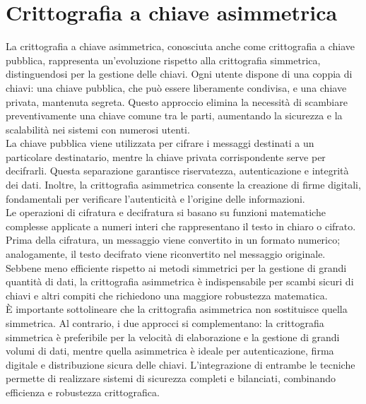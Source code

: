 \documentclass[12pt]{report}
\begin{document}
\section{Crittografia a chiave asimmetrica}  
La crittografia a chiave asimmetrica, conosciuta anche come crittografia a chiave pubblica, rappresenta un'evoluzione rispetto alla crittografia simmetrica, distinguendosi per la gestione delle chiavi. Ogni utente dispone di una coppia di chiavi: una chiave pubblica, che può essere liberamente condivisa, e una chiave privata, mantenuta segreta. Questo approccio elimina la necessità di scambiare preventivamente una chiave comune tra le parti, aumentando la sicurezza e la scalabilità nei sistemi con numerosi utenti.  
\vspace{\baselineskip}\\
La chiave pubblica viene utilizzata per cifrare i messaggi destinati a un particolare destinatario, mentre la chiave privata corrispondente serve per decifrarli. Questa separazione garantisce riservatezza, autenticazione e integrità dei dati. Inoltre, la crittografia asimmetrica consente la creazione di firme digitali, fondamentali per verificare l'autenticità e l'origine delle informazioni.  
\vspace{\baselineskip}\\ 
Le operazioni di cifratura e decifratura si basano su funzioni matematiche complesse applicate a numeri interi che rappresentano il testo in chiaro o cifrato. Prima della cifratura, un messaggio viene convertito in un formato numerico; analogamente, il testo decifrato viene riconvertito nel messaggio originale. Sebbene meno efficiente rispetto ai metodi simmetrici per la gestione di grandi quantità di dati, la crittografia asimmetrica è indispensabile per scambi sicuri di chiavi e altri compiti che richiedono una maggiore robustezza matematica.  
\vspace{\baselineskip}\\  
È importante sottolineare che la crittografia asimmetrica non sostituisce quella simmetrica. Al contrario, i due approcci si complementano: la crittografia simmetrica è preferibile per la velocità di elaborazione e la gestione di grandi volumi di dati, mentre quella asimmetrica è ideale per autenticazione, firma digitale e distribuzione sicura delle chiavi. L'integrazione di entrambe le tecniche permette di realizzare sistemi di sicurezza completi e bilanciati, combinando efficienza e robustezza crittografica.
\end{document}
